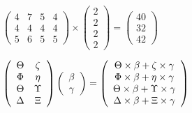 \documentclass[12pt]{article}
\begin{document}
 
 
\noindent{}
 
 

 
$\left( \begin{array}{ccccccccccccccc}
           4  & 
           7  & 
           5  & 
           4  \\ 
           4  & 
           4  & 
           4  & 
           4  \\ 
           5  & 
           6  & 
           5  & 
           5
\end{array}\right) \times
\left( \begin{array}{c}
           2  \\ 
           2  \\ 
           2  \\ 
           2
\end{array}\right)  =
\left( \begin{array}{c}
          40  \\ 
          32  \\ 
          42
\end{array}\right)  $
 
$  %
 \left( \begin{array}
 {
 c
 c
 }
 \Theta & 
                    \zeta \\ 
 \Phi & 
 \eta \\ 
 \Theta & 
 \Upsilon \\ 
 \Delta & 
                    \Xi
 \end{array} \right)
 \left( \begin{array}
 {
 c
 }
 \beta \\ 
 \gamma
 \end{array} \right)
=
 \left( \begin{array}
 {
 c
 }
  \Theta \times  \beta +                     \zeta \times  \gamma \\ 
  \Phi \times  \beta +  \eta \times  \gamma \\ 
  \Theta \times  \beta +  \Upsilon \times  \gamma \\ 
  \Delta \times  \beta +                     \Xi \times  \gamma
 \end{array} \right)
$
 
 
 
\noindent{}
 
 

 
 
\end{document}
